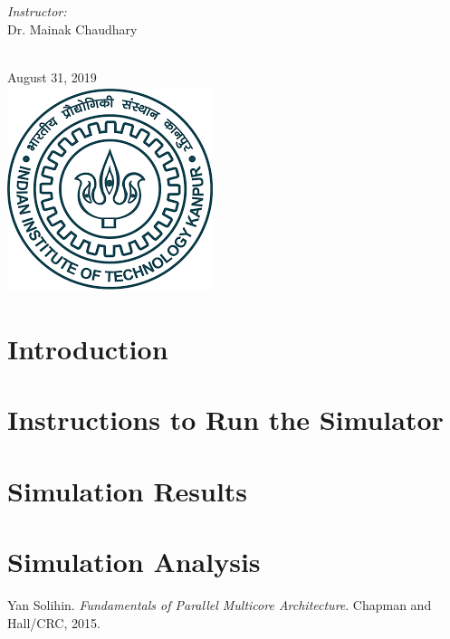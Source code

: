 \documentclass[12pt]{article}
\begin{document}
\begin{titlepage}
\begin{minipage}{0.4\textwidth}
\end{minipage}
\begin{minipage}{0.4\textwidth}
\begin{flushright} \large
\emph{Instructor:} \\
Dr. Mainak Chaudhary %
\end{flushright}
\end{minipage}\\[1cm]
{\large August 31, 2019}\\[1cm] %
\includegraphics[width=6cm,height=6cm,keepaspectratio]{iitk.png}%
\vfill %

\end{titlepage}
\newpage

\section{Introduction}


\section{Instructions to Run the Simulator}


\newpage
\section{Simulation Results}


\vspace{0.3cm}
\section{Simulation Analysis}



\medskip
 
\begin{thebibliography}{9}
Yan Solihin. 
\textit{Fundamentals of Parallel Multicore Architecture}. 
Chapman and Hall/CRC, 2015.

\end{thebibliography}
\end{document}
